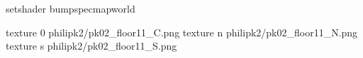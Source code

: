 setshader bumpspecmapworld

texture 0 philipk2/pk02_floor11_C.png
texture n philipk2/pk02_floor11_N.png
texture s philipk2/pk02_floor11_S.png


